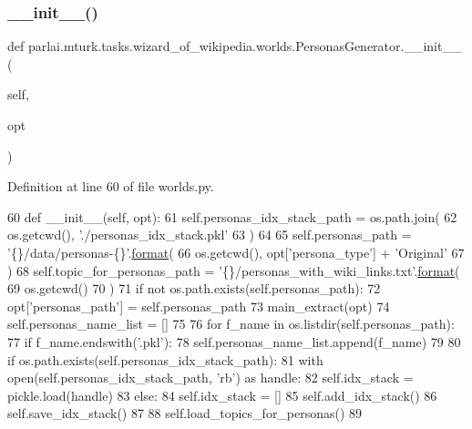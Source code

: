 \subsubsection{\texorpdfstring{\+\_\+\+\_\+init\+\_\+\+\_\+()}{\_\_init\_\_()}}
{\footnotesize\ttfamily def parlai.\+mturk.\+tasks.\+wizard\+\_\+of\+\_\+wikipedia.\+worlds.\+Personas\+Generator.\+\_\+\+\_\+init\+\_\+\+\_\+ (\begin{DoxyParamCaption}\item[{}]{self,  }\item[{}]{opt }\end{DoxyParamCaption})}



Definition at line 60 of file worlds.\+py.


\begin{DoxyCode}
60     \textcolor{keyword}{def }\_\_init\_\_(self, opt):
61         self.personas\_idx\_stack\_path = os.path.join(
62             os.getcwd(), \textcolor{stringliteral}{'./personas\_idx\_stack.pkl'}
63         )
64 
65         self.personas\_path = \textcolor{stringliteral}{'\{\}/data/personas-\{\}'}.\hyperlink{namespaceparlai_1_1chat__service_1_1services_1_1messenger_1_1shared__utils_a32e2e2022b824fbaf80c747160b52a76}{format}(
66             os.getcwd(), opt[\textcolor{stringliteral}{'persona\_type'}] + \textcolor{stringliteral}{'Original'}
67         )
68         self.topic\_for\_personas\_path = \textcolor{stringliteral}{'\{\}/personas\_with\_wiki\_links.txt'}.\hyperlink{namespaceparlai_1_1chat__service_1_1services_1_1messenger_1_1shared__utils_a32e2e2022b824fbaf80c747160b52a76}{format}(
69             os.getcwd()
70         )
71         \textcolor{keywordflow}{if} \textcolor{keywordflow}{not} os.path.exists(self.personas\_path):
72             opt[\textcolor{stringliteral}{'personas\_path'}] = self.personas\_path
73             main\_extract(opt)
74         self.personas\_name\_list = []
75 
76         \textcolor{keywordflow}{for} f\_name \textcolor{keywordflow}{in} os.listdir(self.personas\_path):
77             \textcolor{keywordflow}{if} f\_name.endswith(\textcolor{stringliteral}{'.pkl'}):
78                 self.personas\_name\_list.append(f\_name)
79 
80         \textcolor{keywordflow}{if} os.path.exists(self.personas\_idx\_stack\_path):
81             with open(self.personas\_idx\_stack\_path, \textcolor{stringliteral}{'rb'}) \textcolor{keyword}{as} handle:
82                 self.idx\_stack = pickle.load(handle)
83         \textcolor{keywordflow}{else}:
84             self.idx\_stack = []
85             self.add\_idx\_stack()
86             self.save\_idx\_stack()
87 
88         self.load\_topics\_for\_personas()
89 
\end{DoxyCode}



